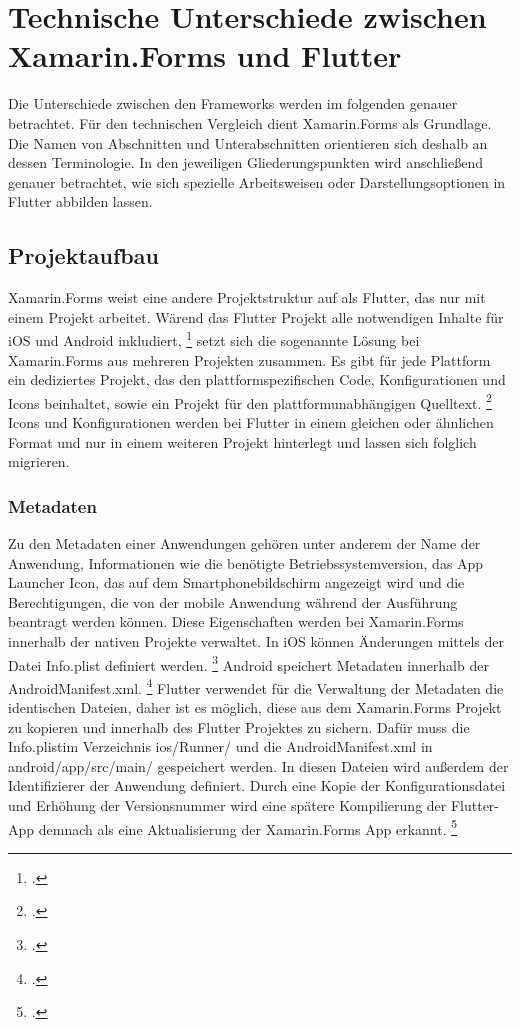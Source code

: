 \chapter{Technische Unterschiede zwischen Xamarin.Forms und Flutter}
\label{chap:CrossPlattformFrameworks}

Die Unterschiede zwischen den Frameworks werden im folgenden genauer betrachtet.  Für den technischen Vergleich dient Xamarin.Forms als Grundlage.  Die Namen von Abschnitten und Unterabschnitten orientieren sich deshalb an dessen Terminologie.  In den jeweiligen Gliederungspunkten wird anschließend genauer betrachtet,  wie sich spezielle Arbeitsweisen oder Darstellungsoptionen in Flutter abbilden lassen. 

\section{Projektaufbau}
Xamarin.Forms weist eine andere Projektstruktur auf als Flutter,  das nur mit einem Projekt arbeitet.  Wärend das Flutter Projekt alle notwendigen Inhalte für iOS und Android inkludiert, \footcite[Vgl.][S. 113]{Biessek2019} setzt sich die sogenannte Lösung bei Xamarin.Forms aus mehreren Projekten zusammen.  Es gibt für jede Plattform ein dediziertes Projekt, das den plattformspezifischen Code,  Konfigurationen und Icons beinhaltet, sowie ein Projekt für den plattformunabhängigen Quelltext.   \footcite[Vgl.][S. 25f.]{Petzold2016} Icons und Konfigurationen werden bei Flutter in einem gleichen oder ähnlichen Format und nur in einem weiteren Projekt hinterlegt und lassen sich folglich migrieren.  


\subsection{Metadaten}
Zu den Metadaten einer Anwendungen gehören unter anderem der Name der Anwendung,  Informationen wie die benötigte Betriebssystemversion, das \glq App Launcher Icon\grq, das auf dem Smartphonebildschirm angezeigt wird und die Berechtigungen,  die von der mobile Anwendung während der Ausführung beantragt werden können.  Diese Eigenschaften werden bei Xamarin.Forms innerhalb der nativen Projekte verwaltet.  In iOS können Änderungen mittels der Datei \glq Info.plist\grq{} definiert werden. \footcite[Vgl.][Abgerufen am \today]{MicrosoftInfoPlist2017} Android speichert Metadaten innerhalb der \glq AndroidManifest.xml\grq{}. \footcite[Vgl.][Abgerufen am \today]{MicrosoftManifest2018} Flutter verwendet für die Verwaltung der Metadaten die identischen Dateien,  daher ist es möglich,  diese aus dem Xamarin.Forms Projekt zu kopieren und innerhalb des Flutter Projektes zu sichern.  Dafür muss die \glq Info.plist\grq im Verzeichnis \glq ios/Runner/\grq{} und die \glq AndroidManifest.xml\grq{}  in \glq android/app/src/main/\grq{} gespeichert werden.  In diesen Dateien wird außerdem der Identifizierer der Anwendung definiert.  Durch eine Kopie der Konfigurationsdatei und Erhöhung der Versionsnummer wird eine spätere Kompilierung der Flutter-App demnach als eine Aktualisierung der Xamarin.Forms App erkannt.  \footcite[Vgl.][Abgerufen am \today]{Rana2020}



